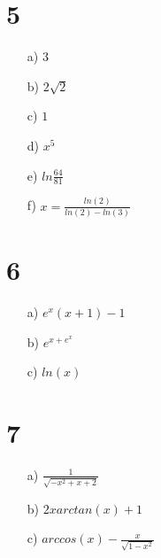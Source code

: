 \documentclass{article}
\begin{document}
\section*{5}
\begin{itemize}
    \item[a) ] $3$
    \item[b) ] $2\sqrt{2}$
    \item[c) ] $1$
    \item[d) ] $x^5$
    \item[e) ] $ln \frac{64}{81}$
    \item[f) ] $x = \frac{ln(2)}{ln(2) - ln(3)}$
\end{itemize}

\section*{6}
\begin{itemize}
    \item[a) ] $e^x(x + 1) - 1$
    \item[b) ] $e^{x+e^{x}}$
    \item[c) ] $ln(x)$
\end{itemize}

\section*{7}
\begin{itemize}
    \item[a) ] $\frac{1}{\sqrt{-x^2 + x + 2}}$
    \item[b) ] $2x arctan(x) +1$
    \item[c) ] $arccos(x) - \frac{x}{\sqrt{1-x^2}}$
\end{itemize}
\end{document}
